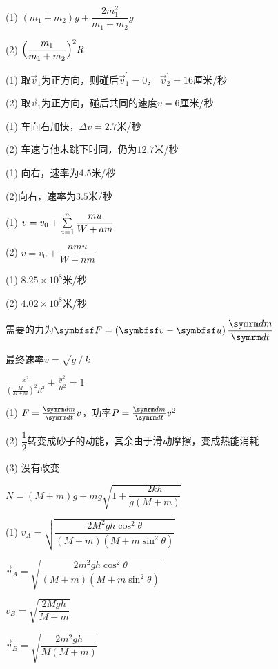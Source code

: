 \answer  (1) $ \left( m _ { 1 } + m _ { 2 } \right) g + \dfrac { 2 m _ { 1 } ^ 2 } { m _ { 1 } + m _ { 2 } } g  $\vspace{-0.5em}

(2) $ \Bigl( \dfrac { m _ { 1 } } { m _ { 1 } + m _ { 2 } } \Bigr) ^ { 2 } R   $

\answer (1) 取$ \vec{v} _ 1 $为正方向，则碰后$  \vec{v} _ { 1 } ^ { \prime } = 0   $， $ \vec{v} _ { 2 } ^ { \prime } = 1 6   $厘米/秒

(2) 取$ \vec{v} _ 1 $为正方向，碰后共同的速度$  v = 6   $厘米/秒

\answer (1) 车向右加快，$  \Delta v = 2 . 7   $米/秒

(2) 车速与他未跳下时同，仍为$ 12.7 $米/秒

\answer (1) 向右，速率为$ 4.5 $米/秒

(2)向右，速率为$ 3.5 $米/秒

\answer (1) $ v = v _ { 0 } + \textstyle\sum\limits _ { a = 1 } ^ n \dfrac { m u } { W + a m } $

(2) $ v = v _ { 0 } + \dfrac { n m u } { W + n m }  $

\answer (1) $ 8.25 \times 10 ^ 8 $米/秒

(2) $4.02\times 10 ^ 8 $米/秒

\answer 需要的力为$ \vec{F} = \left( \vec{v} - \vec{u} \right) \dfrac { \dif m } { \dif t } $

\answer 最终速率$  v = \sqrt { g \operatorname{/} k }  $

\answer $\frac{x^{2}}{\left(\frac{M}{M+m}\right)^{2} R^{2}}+\frac{y^{2}}{R^{2}}=1 $

\answer (1) $ F = \frac { \dif m } { \dif t } v   $，功率$  P = \frac { \dif m } { \dif t } v ^ { 2 }  $

(2) $ \dfrac { 1 } { 2 } $转变成砂子的动能，其余由于滑动摩擦，变成热能消耗

(3) 没有改变

\addtocounter{answer}{2}
\answer $ N = \left( M + m \right) g + m g \sqrt { 1 + \dfrac { 2 k h } { g \left( M + m \right) } }   $

\answer (1) $v_{A}=\sqrt{\dfrac{2 M^{2} g h \cos ^{2} \theta}{(M+m)\left(M+m \sin ^{2} \theta\right)}}$

\aindent $\vec{v}_{A}=\sqrt{\dfrac{2 m^{2} g h \cos ^{2} \theta}{(M+m)\left(M+m \sin ^{2} \theta\right)}}$

\aindent $v_{B}=\sqrt{\dfrac{2 M g h}{M+m}}$

\aindent $\vec{v}_{B}=\sqrt{\dfrac{2 m^{2} g h}{M(M+m)}}$


